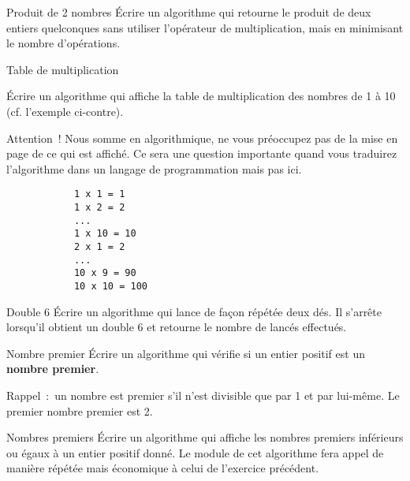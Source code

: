 	\begin{Exercice}{Produit de 2 nombres}
		Écrire un algorithme qui retourne le produit de deux entiers quelconques
		sans utiliser l’opérateur de multiplication, mais en minimisant le
		nombre d’opérations.
	\end{Exercice}

	\begin{Exercice}{Table de multiplication}
		\begin{minipage}[t]{10cm}
			Écrire un algorithme qui affiche la table de multiplication
			des nombres de 1 à 10
			(cf. l’exemple ci-contre).

			\medskip
			Attention~! Nous somme en algorithmique, 
			ne vous préoccupez pas de la mise en page de ce qui est affiché.
			Ce sera une question importante quand vous traduirez 
			l’algorithme dans un langage de programmation mais pas ici. 
		\end{minipage}
		\qquad
		\begin{minipage}[t]{4cm}
		\begin{verbatim}
			1 x 1 = 1
			1 x 2 = 2
			...
			1 x 10 = 10
			2 x 1 = 2
			...
			10 x 9 = 90
			10 x 10 = 100
		\end{verbatim}
		\end{minipage}		
	\end{Exercice}
	
	\begin{Exercice}{Double 6}
		Écrire un algorithme qui lance de façon répétée deux dés.
		Il s’arrête lorsqu’il obtient un double 6
		et retourne le nombre de lancés effectués.
	\end{Exercice}
	
	\begin{Exercice}{Nombre premier}
		Écrire un algorithme qui vérifie si un entier positif est un
		\textbf{nombre premier}. 
		
		Rappel~:~un nombre est premier s’il n’est divisible que par 1 et par
		lui-même. Le premier nombre premier est 2.
	\end{Exercice}
	
	\begin{Exercice}{Nombres premiers}
		Écrire un algorithme qui affiche les nombres premiers inférieurs ou
		égaux à un entier positif donné. Le module de cet algorithme fera appel
		de manière répétée mais économique à celui de l’exercice précédent.
	\end{Exercice}

